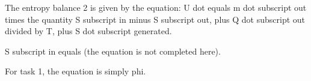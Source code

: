 The entropy balance 2 is given by the equation:
U dot equals m dot subscript out times the quantity S subscript in minus S subscript out, plus Q dot subscript out divided by T, plus S dot subscript generated.

S subscript in equals (the equation is not completed here).

For task 1, the equation is simply phi.